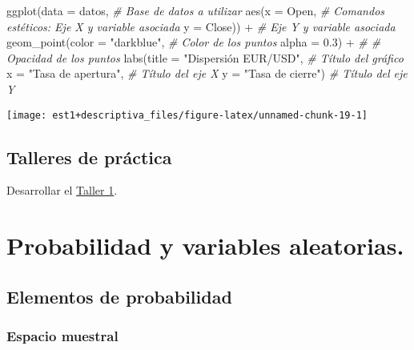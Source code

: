 \documentclass[
]{book}
\newenvironment{Shaded}{\begin{snugshade}}{\end{snugshade}}
\newcommand{\AttributeTok}[1]{\textcolor[rgb]{0.77,0.63,0.00}{#1}}
\newcommand{\CommentTok}[1]{\textcolor[rgb]{0.56,0.35,0.01}{\textit{#1}}}
\newcommand{\FloatTok}[1]{\textcolor[rgb]{0.00,0.00,0.81}{#1}}
\newcommand{\FunctionTok}[1]{\textcolor[rgb]{0.00,0.00,0.00}{#1}}
\newcommand{\NormalTok}[1]{#1}
\newcommand{\SpecialCharTok}[1]{\textcolor[rgb]{0.00,0.00,0.00}{#1}}
\newcommand{\StringTok}[1]{\textcolor[rgb]{0.31,0.60,0.02}{#1}}
\begin{document}
\begin{Shaded}
\begin{Highlighting}[]
\FunctionTok{ggplot}\NormalTok{(}\AttributeTok{data =}\NormalTok{ datos, }\CommentTok{\# Base de datos a utilizar}
       \FunctionTok{aes}\NormalTok{(}\AttributeTok{x =}\NormalTok{ Open, }\CommentTok{\# Comandos estéticos: Eje X y variable asociada}
           \AttributeTok{y =}\NormalTok{ Close)) }\SpecialCharTok{+}  \CommentTok{\# Eje Y y variable asociada}
  \FunctionTok{geom\_point}\NormalTok{(}\AttributeTok{color =} \StringTok{"darkblue"}\NormalTok{, }\CommentTok{\# Color de los puntos}
             \AttributeTok{alpha =} \FloatTok{0.3}\NormalTok{) }\SpecialCharTok{+} \CommentTok{\# \# Opacidad de los puntos}
  \FunctionTok{labs}\NormalTok{(}\AttributeTok{title =} \StringTok{"Dispersión EUR/USD"}\NormalTok{, }\CommentTok{\# Título del gráfico}
       \AttributeTok{x =} \StringTok{"Tasa de apertura"}\NormalTok{, }\CommentTok{\# Título del eje X}
       \AttributeTok{y =} \StringTok{"Tasa de cierre"}\NormalTok{) }\CommentTok{\# Título del eje Y}
\end{Highlighting}
\end{Shaded}

\begin{center}\texttt{[image: est1+descriptiva\_files/figure-latex/unnamed-chunk-19-1]} \end{center}

\hypertarget{talleres-de-pruxe1ctica}{%
\section{Talleres de práctica}\label{talleres-de-pruxe1ctica}}

Desarrollar el \href{https://colab.research.google.com/drive/1wASaDklH5qgHqfCPdri-V2cg00KflJBf?usp=sharing}{Taller 1}.

\hypertarget{probabilidad-y-variables-aleatorias.}{%
\chapter{Probabilidad y variables aleatorias.}\label{probabilidad-y-variables-aleatorias.}}

\hypertarget{elementos-de-probabilidad}{%
\section{Elementos de probabilidad}\label{elementos-de-probabilidad}}

\hypertarget{espacio-muestral}{%
\subsection{Espacio muestral}\label{espacio-muestral}}
\end{document}
